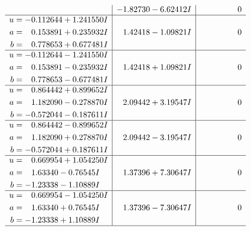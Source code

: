 \documentclass[1p]{elsarticle_modified}
\theoremstyle{definition}
\begin{document}
$$\begin{array}{c|c|c}
 & -1.82730 - 6.62412 I & \phantom{-0.000000 } 0 \\ \hline\begin{aligned}
u &= -0.112644 + 1.241550 I \\
a &= \phantom{-}0.153891 + 0.235932 I \\
b &= \phantom{-}0.778653 + 0.677481 I\end{aligned}
 & \phantom{-}1.42418 - 1.09821 I & \phantom{-0.000000 } 0 \\ \hline\begin{aligned}
u &= -0.112644 - 1.241550 I \\
a &= \phantom{-}0.153891 - 0.235932 I \\
b &= \phantom{-}0.778653 - 0.677481 I\end{aligned}
 & \phantom{-}1.42418 + 1.09821 I & \phantom{-0.000000 } 0 \\ \hline\begin{aligned}
u &= \phantom{-}0.864442 + 0.899652 I \\
a &= \phantom{-}1.182090 - 0.278870 I \\
b &= -0.572044 - 0.187611 I\end{aligned}
 & \phantom{-}2.09442 + 3.19547 I & \phantom{-0.000000 } 0 \\ \hline\begin{aligned}
u &= \phantom{-}0.864442 - 0.899652 I \\
a &= \phantom{-}1.182090 + 0.278870 I \\
b &= -0.572044 + 0.187611 I\end{aligned}
 & \phantom{-}2.09442 - 3.19547 I & \phantom{-0.000000 } 0 \\ \hline\begin{aligned}
u &= \phantom{-}0.669954 + 1.054250 I \\
a &= \phantom{-}1.63340 - 0.76545 I \\
b &= -1.23338 - 1.10889 I\end{aligned}
 & \phantom{-}1.37396 + 7.30647 I & \phantom{-0.000000 } 0 \\ \hline\begin{aligned}
u &= \phantom{-}0.669954 - 1.054250 I \\
a &= \phantom{-}1.63340 + 0.76545 I \\
b &= -1.23338 + 1.10889 I\end{aligned}
 & \phantom{-}1.37396 - 7.30647 I & \phantom{-0.000000 } 0\\
 \hline 
 \end{array}$$\newpage$$\begin{array}{c|c|c}  

\end{array}$$
\end{document}
